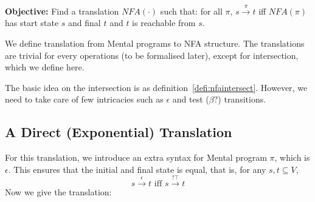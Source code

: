 \textbf{Objective:}
Find a translation $NFA(\cdot)$ such that: for all $\pi$,
$s \xrightarrow{\pi}t $ iff $NFA(\pi)$ has start state $s$ and final $t$ and $t$ is reachable from $s$.

We define translation from Mental programs to NFA structure. The translations are trivial for every operations (to be formalised later), except for intersection, which we define here.

The basic idea on the intersection is as definition~\ref{defi:nfaintersect}. However, we need to take care of few intricacies such as $\epsilon$ and test ($\beta?$) transitions.

\subsection{A Direct (Exponential) Translation}
For this translation, we introduce an extra syntax for Mental program $\pi$, which is $\epsilon$.
This ensures that the initial and final state is equal, that is, for any $s,t\subseteq V$,
$$
s\xrightarrow{\epsilon} t\mbox{ iff } s \xrightarrow{?\top} t
$$
Now we give the translation:
